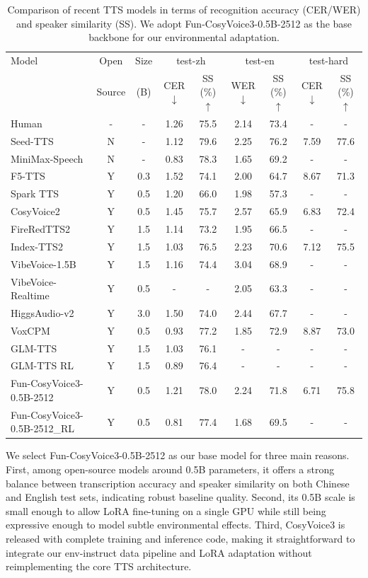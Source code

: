 \documentclass{article}
\begin{document}
\begin{table}[h]
\centering
\scriptsize
\setlength{\tabcolsep}{3pt}
\begin{tabular}{lcccccccc}
\toprule
Model & Open & Size & \multicolumn{2}{c}{test-zh} & \multicolumn{2}{c}{test-en} & \multicolumn{2}{c}{test-hard} \\
 & Source & (B) & CER $\downarrow$ & SS (\%) $\uparrow$ & WER $\downarrow$ & SS (\%) $\uparrow$ & CER $\downarrow$ & SS (\%) $\uparrow$ \\
\midrule
Human & - & - & 1.26 & 75.5 & 2.14 & 73.4 & - & - \\
Seed-TTS & N & - & 1.12 & 79.6 & 2.25 & 76.2 & 7.59 & 77.6 \\
MiniMax-Speech & N & - & 0.83 & 78.3 & 1.65 & 69.2 & - & - \\
F5-TTS & Y & 0.3 & 1.52 & 74.1 & 2.00 & 64.7 & 8.67 & 71.3 \\
Spark TTS & Y & 0.5 & 1.20 & 66.0 & 1.98 & 57.3 & - & - \\
CosyVoice2 & Y & 0.5 & 1.45 & 75.7 & 2.57 & 65.9 & 6.83 & 72.4 \\
FireRedTTS2 & Y & 1.5 & 1.14 & 73.2 & 1.95 & 66.5 & - & - \\
Index-TTS2 & Y & 1.5 & 1.03 & 76.5 & 2.23 & 70.6 & 7.12 & 75.5 \\
VibeVoice-1.5B & Y & 1.5 & 1.16 & 74.4 & 3.04 & 68.9 & - & - \\
VibeVoice-Realtime & Y & 0.5 & - & - & 2.05 & 63.3 & - & - \\
HiggsAudio-v2 & Y & 3.0 & 1.50 & 74.0 & 2.44 & 67.7 & - & - \\
VoxCPM & Y & 0.5 & 0.93 & 77.2 & 1.85 & 72.9 & 8.87 & 73.0 \\
GLM-TTS & Y & 1.5 & 1.03 & 76.1 & - & - & - & - \\
GLM-TTS RL & Y & 1.5 & 0.89 & 76.4 & - & - & - & - \\
Fun-CosyVoice3-0.5B-2512 & Y & 0.5 & 1.21 & 78.0 & 2.24 & 71.8 & 6.71 & 75.8 \\
Fun-CosyVoice3-0.5B-2512\_RL & Y & 0.5 & 0.81 & 77.4 & 1.68 & 69.5 & - & - \\
\bottomrule
\end{tabular}
\caption{Comparison of recent TTS models in terms of recognition accuracy (CER/WER) and speaker similarity (SS). We adopt Fun-CosyVoice3-0.5B-2512 as the base backbone for our environmental adaptation.}
\label{tab:tts_comparison}
\end{table}

We select Fun-CosyVoice3-0.5B-2512 as our base model for three main reasons. First, among open-source models around 0.5B parameters, it offers a strong balance between transcription accuracy and speaker similarity on both Chinese and English test sets, indicating robust baseline quality. Second, its 0.5B scale is small enough to allow LoRA fine-tuning on a single GPU while still being expressive enough to model subtle environmental effects. Third, CosyVoice3 is released with complete training and inference code, making it straightforward to integrate our env-instruct data pipeline and LoRA adaptation without reimplementing the core TTS architecture.
\end{document}
